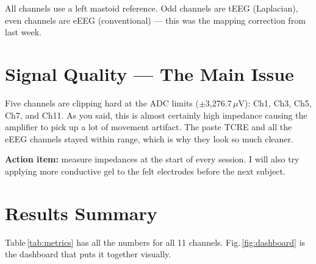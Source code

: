 \documentclass[10pt,conference]{IEEEtran}
\begin{document}
All channels use a left mastoid reference.
Odd channels are tEEG (Laplacian), even channels are eEEG (conventional) ---
this was the mapping correction from last week.

\section{Signal Quality --- The Main Issue}

Five channels are clipping hard at the ADC limits ($\pm$3,276.7\,$\mu$V):
Ch1, Ch3, Ch5, Ch7, and Ch11.
As you said, this is almost certainly high impedance causing the amplifier
to pick up a lot of movement artifact.
The paste TCRE and all the eEEG channels stayed within range, which is
why they look so much cleaner.

\textbf{Action item:} measure impedances at the start of every session.
I will also try applying more conductive gel to the felt electrodes before
the next subject.

\section{Results Summary}

Table\,\ref{tab:metrics} has all the numbers for all 11 channels.
Fig.\,\ref{fig:dashboard} is the dashboard that puts it together visually.
\end{document}
